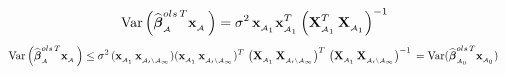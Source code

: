 \documentclass[11pt]{report}
\newcommand{\bfmath}[1]{\mbox{\boldmath$#1$\unboldmath}}
\begin{document}
\begin{enumerate}
$$ \quad \text{Var}\left( \widehat{\bfmath{\beta}}^{ols\,T}_{_\mathcal{A}}\mathbf{x}_{_\mathcal{A}}\,\right) = \mathbf{\sigma}^{2}\,\mathbf{x}_{_{\mathcal{A}_1}}\mathbf{x}^{T}_{_{\mathcal{A}_1}}\left( \mathbf{X}^{T}_{_{\mathcal{A}_1}}\,\mathbf{X}_{_{\mathcal{A}_1}}\right)^{-1}\, $$
$$ \quad \text{Var}\left( \widehat{\bfmath{\beta}}^{ols\,T}_{_\mathcal{A}}\mathbf{x}_{_\mathcal{A}}\,\right) \leq \mathbf{\sigma}^{2}\,(\mathbf{x}_{_{\mathcal{A}_1}}\,\mathbf{x}_{_{\mathcal{A_0}\setminus \mathcal{A_1}}})(\mathbf{x}_{_{\mathcal{A}_1}}\,\mathbf{x}_{_{\mathcal{A_0}
\setminus\mathcal{A_1}}})^{T}\,\left( \mathbf{X}_{_{\mathcal{A}_1}}\,\mathbf{X}_{_{\mathcal{A_0
\setminus A_1}}}\right)^{T}\,\left(\mathbf{X}_{_{\mathcal{A}_1}}\,\mathbf{X}_{_{\mathcal{A_0 \setminus A_1}}}\right)^{-1}\,= \text{Var}(\widehat{\bfmath{\beta}}^{ols\,T}_{_{\mathcal{A}_0}}\mathbf{x}_{_{\mathcal{A}_0}})\, $$

\end{enumerate}
\noindent
\end{document}

